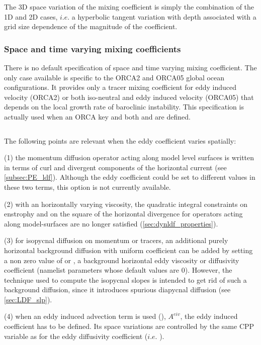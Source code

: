 \documentclass[../tex_main/NEMO_manual]{subfiles}
\begin{document}
The 3D space variation of the mixing coefficient is simply the combination of the 1D and 2D cases,
$i.e.$ a hyperbolic tangent variation with depth associated with a grid size dependence of
the magnitude of the coefficient. 

\subsubsection{Space and time varying mixing coefficients}

There is no default specification of space and time varying mixing coefficient. 
The only case available is specific to the ORCA2 and ORCA05 global ocean configurations.
It provides only a tracer mixing coefficient for eddy induced velocity (ORCA2) or both iso-neutral and
eddy induced velocity (ORCA05) that depends on the local growth rate of baroclinic instability.
This specification is actually used when an ORCA key and both  and  are defined.

$\ $\newline    %

The following points are relevant when the eddy coefficient varies spatially:

(1) the momentum diffusion operator acting along model level surfaces is written in terms of curl and
divergent components of the horizontal current (see \autoref{subsec:PE_ldf}).
Although the eddy coefficient could be set to different values in these two terms,
this option is not currently available. 

(2) with an horizontally varying viscosity, the quadratic integral constraints on enstrophy and on the square of
the horizontal divergence for operators acting along model-surfaces are no longer satisfied
(\autoref{sec:dynldf_properties}).

(3) for isopycnal diffusion on momentum or tracers, an additional purely horizontal background diffusion with
uniform coefficient can be added by setting a non zero value of  or ,
a background horizontal eddy viscosity or diffusivity coefficient
(namelist parameters whose default values are $0$).
However, the technique used to compute the isopycnal slopes is intended to get rid of such a background diffusion,
since it introduces spurious diapycnal diffusion (see \autoref{sec:LDF_slp}).

(4) when an eddy induced advection term is used (),
$A^{eiv}$, the eddy induced coefficient has to be defined.
Its space variations are controlled by the same CPP variable as for the eddy diffusivity coefficient
($i.e.$ ). 
\end{document}
